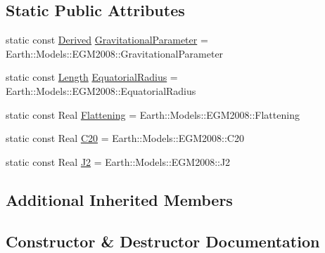 \subsection*{Static Public Attributes}
\begin{DoxyCompactItemize}
\item 
static const \hyperlink{classostk_1_1physics_1_1units_1_1_derived}{Derived} \hyperlink{classostk_1_1physics_1_1env_1_1obj_1_1celest_1_1_earth_a63bdb61b8a2b26066efc4ba7985c2060}{Gravitational\+Parameter} = Earth\+::\+Models\+::\+E\+G\+M2008\+::\+Gravitational\+Parameter
\item 
static const \hyperlink{classostk_1_1physics_1_1units_1_1_length}{Length} \hyperlink{classostk_1_1physics_1_1env_1_1obj_1_1celest_1_1_earth_ac700d34023a4654da6f781fc097034ad}{Equatorial\+Radius} = Earth\+::\+Models\+::\+E\+G\+M2008\+::\+Equatorial\+Radius
\item 
static const Real \hyperlink{classostk_1_1physics_1_1env_1_1obj_1_1celest_1_1_earth_ad1cb5b01fc6cdf263dd97aa5bcb62b78}{Flattening} = Earth\+::\+Models\+::\+E\+G\+M2008\+::\+Flattening
\item 
static const Real \hyperlink{classostk_1_1physics_1_1env_1_1obj_1_1celest_1_1_earth_a51d8f851ef1f2c199dbf7707d9843eb4}{C20} = Earth\+::\+Models\+::\+E\+G\+M2008\+::\+C20
\item 
static const Real \hyperlink{classostk_1_1physics_1_1env_1_1obj_1_1celest_1_1_earth_a0c09ef7a4fb1f6d5d077e4108fb4e56a}{J2} = Earth\+::\+Models\+::\+E\+G\+M2008\+::\+J2
\end{DoxyCompactItemize}
\subsection*{Additional Inherited Members}


\subsection{Constructor \& Destructor Documentation}
\mbox{\label{classostk_1_1physics_1_1env_1_1obj_1_1celest_1_1_earth_aeed4d52f7da5b8f895701eb79826599a}} 
